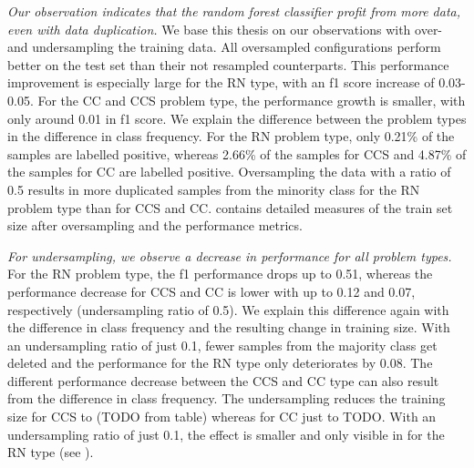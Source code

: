 \textit{Our observation indicates that the random forest classifier profit from more data, even with data duplication.} We base this thesis on our observations with over- and undersampling the training data. 
All oversampled configurations perform better on the test set than their not resampled counterparts. This performance improvement is especially large for the RN type, with an f1 score increase of 0.03-0.05. For the CC and CCS problem type, the performance growth is smaller, with only around 0.01 in f1 score. We explain the difference between the problem types in the difference in class frequency. For the RN problem type, only 0.21\% of the samples are labelled positive, whereas 2.66\% of the samples for CCS and 4.87\% of the samples for CC are labelled positive. Oversampling the data with a ratio of 0.5 results in more duplicated samples from the minority class for the RN problem type than for CCS and CC.  contains detailed measures of the train set size after oversampling and the performance metrics.

\textit{For undersampling, we observe a decrease in performance for all problem types.} For the RN problem type, the f1 performance drops up to 0.51, whereas the performance decrease for CCS and CC is lower with up to 0.12 and 0.07, respectively (undersampling ratio of 0.5). We explain this difference again with the difference in class frequency and the resulting change in training size. With an undersampling ratio of just 0.1, fewer samples from the majority class get deleted and the performance for the RN type only deteriorates by 0.08.
The different performance decrease between the CCS and CC type can also result from the difference in class frequency. The undersampling reduces the training size for CCS to (TODO from table) whereas for CC just to TODO. With an undersampling ratio of just 0.1, the effect is smaller and only visible in for the RN type (see ).


